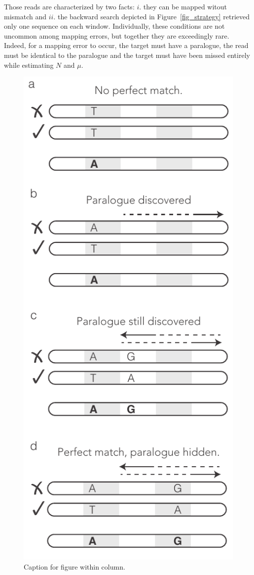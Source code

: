 \documentclass[a4,center,fleqn]{NAR}
\begin{document}
Those reads are characterized by two facts: $i.$ they can be mapped witout
mismatch and $ii.$ the backward search depicted in
Figure~\ref{fig_strategy} retrieved only one sequence on each window.
Individually, these conditions are not uncommon among mapping errors, but
together they are exceedingly rare. Indeed, for a mapping error to occur,
the target must have a paralogue, the read must be identical to the
paralogue and the target must have been missed entirely while estimating
$N$ and $\mu$.

\begin{figure}[t]
\begin{center}
\includegraphics{super_reads.pdf}
\end{center}
\caption{Caption for figure within column.}
\label{fig_super}
\end{figure}
\end{document}
